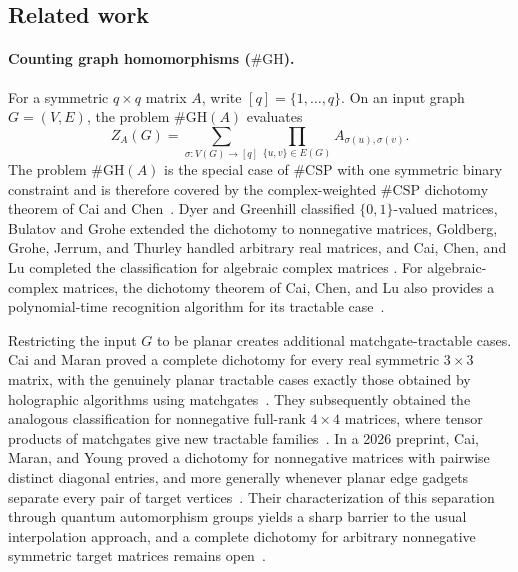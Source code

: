 \documentclass[11pt]{article}
\theoremstyle{plain}
\theoremstyle{definition}
\theoremstyle{remark}
\begin{document}
\subsection{Related work}

\paragraph{Counting graph homomorphisms ($\#\mathrm{GH}$).}
For a symmetric $q\times q$ matrix $A$, write $[q]=\{1,\ldots,q\}$.  On an
input graph $G=(V,E)$, the problem $\#\mathrm{GH}(A)$ evaluates
\[
  Z_A(G)=\sum_{\sigma:V(G)\to[q]}
    \prod_{\{u,v\}\in E(G)}A_{\sigma(u),\sigma(v)}.
\]
The problem $\#\mathrm{GH}(A)$ is the special case of $\#\mathrm{CSP}$ with
one symmetric binary constraint and is therefore covered by the
complex-weighted $\#\mathrm{CSP}$ dichotomy theorem of Cai and
Chen~\cite{CaiChen2017}.  Dyer and Greenhill classified $\{0,1\}$-valued
matrices, Bulatov and Grohe
extended the dichotomy to nonnegative matrices, Goldberg, Grohe, Jerrum, and
Thurley handled arbitrary real matrices, and Cai, Chen, and Lu completed the
classification for algebraic complex matrices
\cite{DyerGreenhill2000,DyerGreenhill2004,BulatovGrohe2005,
GoldbergGroheJerrumThurley2010,CaiChenLu2013}.  For algebraic-complex
matrices, the dichotomy theorem of Cai, Chen, and Lu also provides a
polynomial-time recognition algorithm for its tractable
case~\cite[Theorem~1.2]{CaiChenLu2013}.

Restricting the input $G$ to be planar creates additional matchgate-tractable
cases.  Cai and Maran proved a complete dichotomy for every real symmetric
$3\times3$ matrix, with the genuinely planar tractable cases exactly those
obtained by holographic algorithms using matchgates~\cite{CaiMaran2023}.
They subsequently obtained the analogous classification for nonnegative
full-rank $4\times4$ matrices, where tensor products of matchgates give new
tractable families~\cite{CaiMaran2024}.  In a 2026 preprint, Cai, Maran, and
Young proved a dichotomy for nonnegative matrices with pairwise distinct
diagonal entries, and more generally whenever planar edge gadgets separate
every pair of target vertices~\cite{CaiMaranYoung2026}.  Their characterization
of this separation through quantum automorphism groups yields a sharp barrier
to the usual interpolation approach, and a complete dichotomy for arbitrary
nonnegative symmetric target matrices remains open~\cite{CaiMaranYoung2026}.
\end{document}

